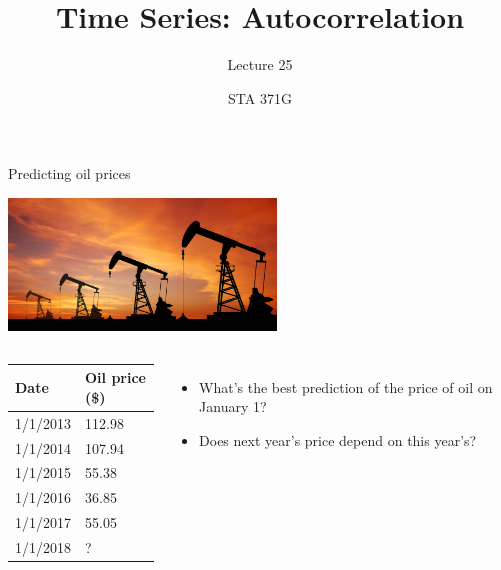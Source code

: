\documentclass{beamer}\usepackage[]{graphicx}\usepackage[]{color}
\title{Time Series: Autocorrelation}
\subtitle{Lecture 25}
\author{STA 371G}
\begin{document}
  
  

  \frame{\maketitle}



  \begin{darkframes}

    \begin{frame}{Predicting oil prices}
      \fontsize{10}{10}\selectfont
      \begin{center}
        \includegraphics[width=2.8in]{pumpjack} \\
      \end{center}

      \vspace{-0.1in}
      \begin{columns}[onlytextwidth]
            \begin{center}
              \begin{tabular}{ll}
              \hline
              Date & Oil price (\$) \\
              \hline
              1/1/2013 & 112.98  \\
              1/1/2014 & 107.94 \\
              1/1/2015 & 55.38 \\
              1/1/2016 & 36.85 \\
              1/1/2017 & 55.05 \\
              1/1/2018 & ? \\
              \hline
            \end{tabular}
          \end{center} \pause

          \begin{itemize}[<+->]
            \item What's the best prediction of the price of oil on January 1?
            \item Does next year's price depend on this year's?
          \end{itemize}
      \end{columns}
      \lc
    \end{frame}





\end{darkframes}
\end{document}
